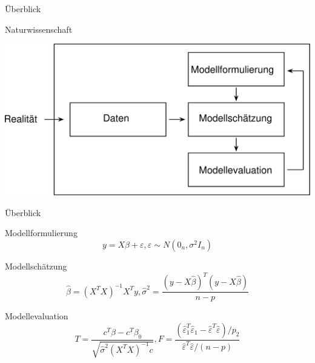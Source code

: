 \documentclass[
  8pt,
  ignorenonframetext,
]{beamer}
\begin{document}
\begin{frame}{Überblick}
\protect\hypertarget{uxfcberblick-1}{}
\large

Naturwissenschaft \vspace{7mm}

\begin{center}\includegraphics[width=0.9\linewidth]{5_Abbildungen/alm_5_wissenschaft} \end{center}
\end{frame}

\begin{frame}{Überblick}
\protect\hypertarget{uxfcberblick-2}{}
\vspace{1mm}
\normalsize

Modellformulierung \vspace{1mm} \small \begin{equation}
y = X\beta + \varepsilon, \varepsilon \sim N(0_n,\sigma^2I_n)
\end{equation} \vspace{5mm}

\normalsize

Modellschätzung \small \begin{equation}
\hat{\beta} = (X^TX)^{-1} X^Ty,  \hat{\sigma}^2 = \frac{(y - X\hat{\beta})^T(y - X\hat{\beta})}{n-p}
\end{equation} \vspace{4mm}

\normalsize

Modellevaluation \small \begin{equation}
T = \frac{c^T\hat{\beta} - c^T\beta_0}{\sqrt{\hat{\sigma}^2(X^TX)^{-1}c}}, 
F = \frac{(\hat{\varepsilon}_1^T\hat{\varepsilon}_1 - \hat{\varepsilon}^T\hat{\varepsilon})/p_2}{\hat{\varepsilon}^T\hat{\varepsilon}/(n-p)}
\end{equation}
\end{frame}
\end{document}
